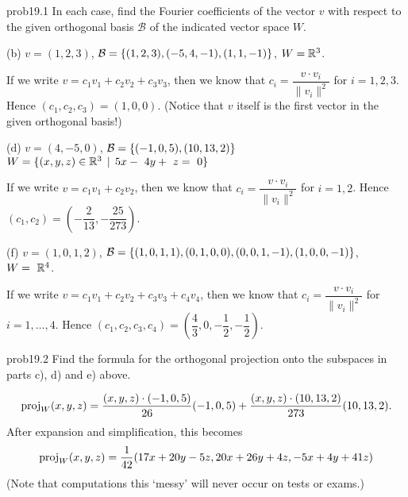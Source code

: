
 


\begin{sol}{prob19.1} In each case, find the Fourier coefficients of the vector $v$ with respect to the given orthogonal basis $\mathcal B$  of the indicated vector space $W$.
\medskip

(b)  $v=(1,2,3)$, $\mathcal B = \{(1, 2 , 3 ),(-5, 4, -1),(1, 1, -1) \}$, $W=\mathbb{R}^3$.

\soln If we write $v= c_1 v_1+c_2 v_2+c_3 v_3$, then we know that 
$ c_i= \dfrac{v\cdot v_i}{\| v_i\|^2}$ for $i=1,2,3$. Hence $(c_1, c_2, c_3)=(1,0,0)$. (Notice that $v$ itself is the first vector in the given orthogonal basis!)
\medskip
%

(d) $v=(4,-5,0)$, $\mathcal B = \{(-1, 0, 5),(10, 13, 2) \}$   $W=\{(x,y,z)\in\mathbb{R}^3 \,\mid \, 5x-~4y+~z=~0 \}$

\soln If we write $v= c_1 v_1+c_2 v_2$, then we know that 
$ c_i= \dfrac{v\cdot v_i}{\| v_i\|^2}$ for $i=1,2$. Hence $(c_1, c_2)=(-\dfrac{2}{13},-\dfrac{25}{273})$. 
\medskip
%

(f) $v=(1,0,1,2)$,  $\mathcal B =\{(1, 0, 1, 1), (0, 1, 0, 0), (0, 0, 1, -1),(1, 0, 0, -1) \}$, $W=~\mathbb{R}^4$.

\soln
If we write $v= c_1 v_1+c_2 v_2+c_3 v_3+c_4 v_4$, then we know that 
$ c_i= \dfrac{v\cdot v_i}{\| v_i\|^2}$ for $i=1,\dots ,4$. Hence $(c_1, c_2, c_3, c_4)=(\dfrac{4}{3},0,-\dfrac{1}{2},-\dfrac{1}{2})$.
\medskip

\end{sol}

\begin{sol}{prob19.2} Find the formula for the orthogonal projection onto the subspaces in parts c), d) and e) above.

\soln  $$\operatorname{proj}_W(x,y,z)=\dfrac{(x,y,z)\cdot (-1, 0, 5)}{26}(-1, 0, 5)+\dfrac{(x,y,z)\cdot (10, 13, 2)}{273}(10, 13, 2).$$ After expansion and simplification, this becomes $$\operatorname{proj}_W(x,y,z)=\dfrac{1}{42}(17 x+20 y-5 z,20 x+26 y+4 z,-5 x+4 y+41 z)$$
(Note that computations this `messy' will never occur on tests or exams.)

\end{sol}

